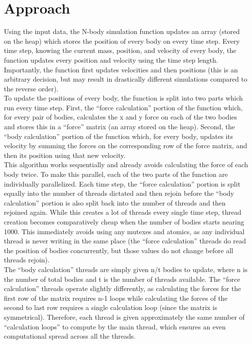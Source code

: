 \documentclass{article}
\begin{document}
\section{Approach}
Using the input data, the N-body simulation function updates an array (stored on the heap) which stores the position of every body on every time step. Every time step, knowing the current mass, position, and velocity of every body, the function updates every position and velocity using the time step length. Importantly, the function first updates velocities and then positions (this is an arbitrary decision, but may result in drastically different simulations compared to the reverse order).\\


To update the positions of every body, the function is split into two parts which run every time step. First, the “force calculation” portion of the function which, for every pair of bodies, calculates the x and y force on each of the two bodies and stores this in a “force” matrix (an array stored on the heap). Second, the “body calculation” portion of the function which, for every body, updates its velocity by summing the forces on the corresponding row of the force matrix, and then its position using that new velocity.\\


This algorithm works sequentially and already avoids calculating the force of each body twice. To make this parallel, each of the two parts of the function are individually parallelized. Each time step, the “force calculation” portion is split equally into the number of threads dictated and then rejoin before the “body calculation” portion is also split back into the number of threads and then rejoined again. While this creates a lot of threads every single time step, thread creation becomes comparatively cheap when the number of bodies starts nearing 1000. This immediately avoids using any mutexes and atomics, as any individual thread is never writing in the same place (the “force calculation” threads do read the position of bodies concurrently, but those values do not change before all threads rejoin).\\


The “body calculation” threads are simply given n/t bodies to update, where n is the number of total bodies and t is the number of threads available. The “force calculation” threads operate slightly differently, as calculating the forces for the first row of the matrix requires n-1 loops while calculating the forces of the second to last row requires a single calculation loop (since the matrix is symmetrical). Therefore, each thread is given approximately the same number of “calculation loops” to compute by the main thread, which ensures an even computational spread across all the threads.
\end{document}
